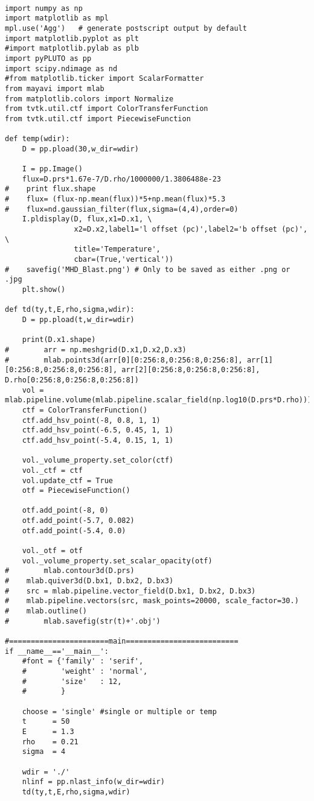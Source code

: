 \begin{lstlisting}

import numpy as np
import matplotlib as mpl
mpl.use('Agg')   # generate postscript output by default
import matplotlib.pyplot as plt
#import matplotlib.pylab as plb
import pyPLUTO as pp
import scipy.ndimage as nd
#from matplotlib.ticker import ScalarFormatter
from mayavi import mlab
from matplotlib.colors import Normalize
from tvtk.util.ctf import ColorTransferFunction
from tvtk.util.ctf import PiecewiseFunction

def temp(wdir):
    D = pp.pload(30,w_dir=wdir)

    I = pp.Image()
    flux=D.prs*1.67e-7/D.rho/1000000/1.3806488e-23
#    print flux.shape
#    flux= (flux-np.mean(flux))*5+np.mean(flux)*5.3
#    flux=nd.gaussian_filter(flux,sigma=(4,4),order=0)
    I.pldisplay(D, flux,x1=D.x1, \
                x2=D.x2,label1='l offset (pc)',label2='b offset (pc)',                                    \
                title='Temperature',
                cbar=(True,'vertical'))
#    savefig('MHD_Blast.png') # Only to be saved as either .png or .jpg
    plt.show()

def td(ty,t,E,rho,sigma,wdir):
    D = pp.pload(t,w_dir=wdir)

    print(D.x1.shape)
#        arr = np.meshgrid(D.x1,D.x2,D.x3)
#        mlab.points3d(arr[0][0:256:8,0:256:8,0:256:8], arr[1][0:256:8,0:256:8,0:256:8], arr[2][0:256:8,0:256:8,0:256:8], D.rho[0:256:8,0:256:8,0:256:8])
    vol = mlab.pipeline.volume(mlab.pipeline.scalar_field(np.log10(D.prs*D.rho)))
    ctf = ColorTransferFunction()
    ctf.add_hsv_point(-8, 0.8, 1, 1)
    ctf.add_hsv_point(-6.5, 0.45, 1, 1)
    ctf.add_hsv_point(-5.4, 0.15, 1, 1)

    vol._volume_property.set_color(ctf)
    vol._ctf = ctf
    vol.update_ctf = True
    otf = PiecewiseFunction()

    otf.add_point(-8, 0)
    otf.add_point(-5.7, 0.082)
    otf.add_point(-5.4, 0.0)

    vol._otf = otf
    vol._volume_property.set_scalar_opacity(otf)
#        mlab.contour3d(D.prs)
#    mlab.quiver3d(D.bx1, D.bx2, D.bx3)
#    src = mlab.pipeline.vector_field(D.bx1, D.bx2, D.bx3)
#    mlab.pipeline.vectors(src, mask_points=20000, scale_factor=30.)
#    mlab.outline()
#        mlab.savefig(str(t)+'.obj')

#=======================main==========================
if __name__=='__main__':
    #font = {'family' : 'serif',
    #        'weight' : 'normal',
    #        'size'   : 12,
    #        }

    choose = 'single' #single or multiple or temp
    t      = 50
    E      = 1.3
    rho    = 0.21
    sigma  = 4

    wdir = './'
    nlinf = pp.nlast_info(w_dir=wdir)
    td(ty,t,E,rho,sigma,wdir)

\end{lstlisting}


